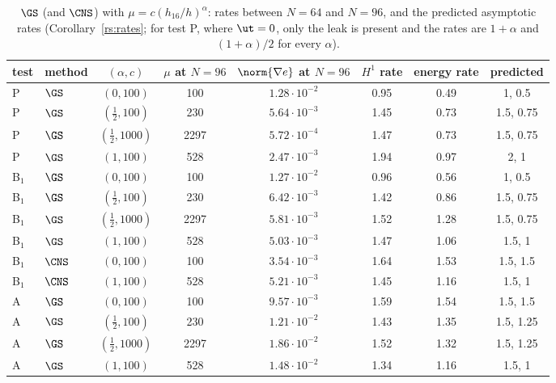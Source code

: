 \begin{table}[h]
\centering\small
\caption{$\GS$ (and $\CNS$) with $\mu=c(h_{16}/h)^\alpha$: rates between $N=64$ and $N=96$, and the predicted asymptotic rates (Corollary~\ref{rs:rates}; for test P, where $\ut=0$, only the leak is present and the rates are $1+\alpha$ and $(1+\alpha)/2$ for every $\alpha$).}\label{rs:tab:rates}
\begin{tabular}{llcccccc}
\toprule
test & method & $(\alpha,c)$ & $\mu$ at $N=96$ & $\norm{\nabla e}$ at $N=96$ & $H^1$ rate & energy rate & predicted\\
\midrule
P & $\GS$ & $(0,100)$ & 100 & $1.28\cdot10^{-2}$ & 0.95 & 0.49 & 1, 0.5\\
P & $\GS$ & $(\frac12,100)$ & 230 & $5.64\cdot10^{-3}$ & 1.45 & 0.73 & 1.5, 0.75\\
P & $\GS$ & $(\frac12,1000)$ & 2297 & $5.72\cdot10^{-4}$ & 1.47 & 0.73 & 1.5, 0.75\\
P & $\GS$ & $(1,100)$ & 528 & $2.47\cdot10^{-3}$ & 1.94 & 0.97 & 2, 1\\
\midrule
B$_1$ & $\GS$ & $(0,100)$ & 100 & $1.27\cdot10^{-2}$ & 0.96 & 0.56 & 1, 0.5\\
B$_1$ & $\GS$ & $(\frac12,100)$ & 230 & $6.42\cdot10^{-3}$ & 1.42 & 0.86 & 1.5, 0.75\\
B$_1$ & $\GS$ & $(\frac12,1000)$ & 2297 & $5.81\cdot10^{-3}$ & 1.52 & 1.28 & 1.5, 0.75\\
B$_1$ & $\GS$ & $(1,100)$ & 528 & $5.03\cdot10^{-3}$ & 1.47 & 1.06 & 1.5, 1\\
B$_1$ & $\CNS$ & $(0,100)$ & 100 & $3.54\cdot10^{-3}$ & 1.64 & 1.53 & 1.5, 1.5\\
B$_1$ & $\CNS$ & $(1,100)$ & 528 & $5.21\cdot10^{-3}$ & 1.45 & 1.16 & 1.5, 1\\
\midrule
A & $\GS$ & $(0,100)$ & 100 & $9.57\cdot10^{-3}$ & 1.59 & 1.54 & 1.5, 1.5\\
A & $\GS$ & $(\frac12,100)$ & 230 & $1.21\cdot10^{-2}$ & 1.43 & 1.35 & 1.5, 1.25\\
A & $\GS$ & $(\frac12,1000)$ & 2297 & $1.86\cdot10^{-2}$ & 1.52 & 1.32 & 1.5, 1.25\\
A & $\GS$ & $(1,100)$ & 528 & $1.48\cdot10^{-2}$ & 1.34 & 1.16 & 1.5, 1\\
\bottomrule
\end{tabular}
\end{table}

